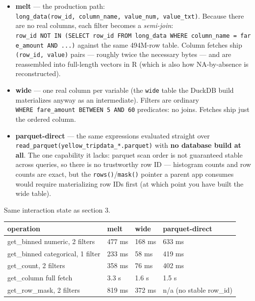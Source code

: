 \documentclass[
  11pt,
]{article}
\newcounter{none} %
\providecommand{\tightlist}{%
  \setlength{\itemsep}{0pt}\setlength{\parskip}{0pt}}
\begin{document}
\begin{itemize}
\tightlist
\item
  \textbf{melt} --- the production path:
  \texttt{long\_data(row\_id,\ column\_name,\ value\_num,\ value\_txt)}.
  Because there are no real columns, each filter becomes a
  \emph{semi-join}:
  \texttt{row\_id\ NOT\ IN\ (SELECT\ row\_id\ FROM\ long\_data\ WHERE\ column\_name\ =\ \textquotesingle{}fare\_amount\textquotesingle{}\ AND\ ...)}
  against the same 494M-row table. Column fetches ship
  \texttt{(row\_id,\ value)} pairs --- roughly twice the necessary bytes
  --- and are reassembled into full-length vectors in R (which is also
  how NA-by-absence is reconstructed).
\item
  \textbf{wide} --- one real column per variable (the \texttt{wide}
  table the DuckDB build materializes anyway as an intermediate).
  Filters are ordinary \texttt{WHERE\ fare\_amount\ BETWEEN\ 5\ AND\ 60}
  predicates: no joins. Fetches ship just the ordered column.
\item
  \textbf{parquet-direct} --- the same expressions evaluated straight
  over
  \texttt{read\_parquet(\textquotesingle{}yellow\_tripdata\_*.parquet\textquotesingle{})}
  with \textbf{no database build at all}. The one capability it lacks:
  parquet scan order is not guaranteed stable across queries, so there
  is no trustworthy row ID --- histogram counts and row counts are
  exact, but the \texttt{rows()}/\texttt{mask()} pointer a parent app
  consumes would require materializing row IDs first (at which point you
  have built the wide table).
\end{itemize}

Same interaction state as section 3.

{\def\LTcaptype{none} %
\begin{longtable}[]{@{}llll@{}}
\toprule\noalign{}
operation & melt & wide & parquet-direct \\
\midrule\noalign{}
\endhead
\bottomrule\noalign{}
\endlastfoot
get\_binned numeric, 2 filters & 477 ms & 168 ms & 633 ms \\
get\_binned categorical, 1 filter & 233 ms & 58 ms & 419 ms \\
get\_count, 2 filters & 358 ms & 76 ms & 402 ms \\
get\_column full fetch & 3.3 s & 1.6 s & 1.5 s \\
get\_row\_mask, 2 filters & 819 ms & 372 ms & n/a (no stable row\_id) \\
\end{longtable}
}
\end{document}
